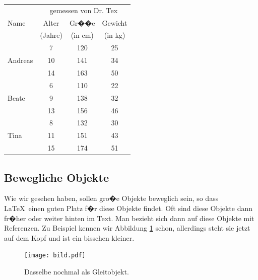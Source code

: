 \documentclass[11pt,a4paper]{article} %
\begin{document}
\begin{center}
\begin{tabular}{|l||c|c|c|}
\hline
           & \multicolumn{3}{|c|}{gemessen von Dr. Tex} \\
\cline{2-4}
Name       &  Alter    & Gr��e   & Gewicht \\
           &  (Jahre)  & (in cm) & (in kg) \\
\hline
\hline
           &   7       &  120    &  25     \\
\cline{2-4}
Andreas    &   10      &  141    &  34     \\
\cline{2-4}
           &   14      &  163    &  50     \\
\hline
           &   6       &  110    &  22     \\
\cline{2-4}
Beate      &   9       &  138    &  32     \\
\cline{2-4}
           &   13      &  156    &  46     \\
\hline
           &   8       &  132    &  30     \\
\cline{2-4}
Tina       &   11      &  151    &  43     \\
\cline{2-4}
           &   15      &  174    &  51     \\
\hline
\end{tabular}
\end{center}

\subsection{Bewegliche Objekte}
\label{Floats}

Wie wir gesehen haben, sollen gro�e Objekte beweglich sein, so dass \LaTeX\ einen guten Platz f�r diese Objekte findet. Oft sind diese Objekte dann fr�her oder weiter hinten im Text. Man bezieht sich dann auf diese Objekte mit Referenzen. Zu Beispiel kennen wir Abbildung \ref{bild} schon, allerdings steht sie jetzt auf dem Kopf und ist ein bisschen kleiner.

\begin{figure}[h]
\begin{center}
\texttt{[image: bild.pdf]}
\caption{Dasselbe nochmal als Gleitobjekt. \label{bild}}
\end{center}
\end{figure}

\end{document}
